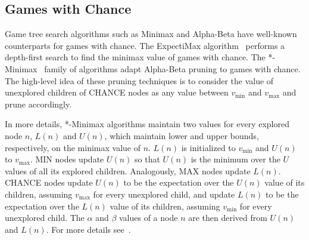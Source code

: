\documentclass[runningheads]{llncs}
\newcommand{\pess}{\mathit{L}}
\newcommand{\opti}{\mathit{U}}
\newcommand{\vmax}{v_{\text{max}}}
\newcommand{\vmin}{v_{\text{min}}}
\begin{document}
\subsection{Games with Chance}
Game tree search algorithms such as Minimax and Alpha-Beta have well-known counterparts for games with chance.
The ExpectiMax algorithm~\citep{michie1966game} performs a depth-first search to find the minimax value of games with chance.
The *-Minimax~\citep{ballard1983minimax} family of algorithms adapt Alpha-Beta pruning to games with chance. The high-level idea of these pruning techniques is to consider the value of unexplored children of CHANCE nodes as any value between $\vmin$ and $\vmax$ and prune accordingly. 

In more details, *-Minimax algorithms maintain two values for every explored node $n$, $\pess(n)$ and $\opti(n)$, which maintain lower and upper bounds, respectively, on the minimax value of $n$. 
$\pess(n)$ is initialized to $\vmin$ and $\opti(n)$ to $\vmax$. 
MIN nodes update $\opti(n)$ so that $\opti(n)$ is the minimum over the $\opti$ values of all its explored children. Analogously, MAX nodes update $\pess(n)$. CHANCE nodes update $\opti(n)$ to be the expectation over the $\opti(n)$ value of its children, assuming $\vmax{}$ for every unexplored child, and update $\pess(n)$ to be the expectation over the $\pess(n)$ value of its children, assuming $\vmin{}$ for every unexplored child. 
The $\alpha$ and $\beta$ values of a node $n$ are then derived from $\opti(n)$ and $\pess(n)$. For more details see~\citep{hauk2004rediscovering}. 

\end{document}

